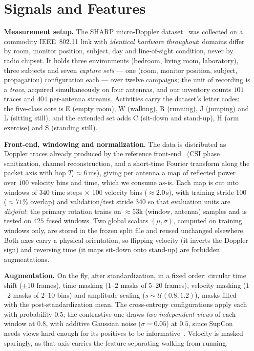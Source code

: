 \section{Signals and Features}
\label{sec:model}

\textbf{Measurement setup.} The SHARP micro-Doppler
dataset~\cite{Meneghello-2023} was collected on a commodity IEEE~802.11 link
with \emph{identical hardware throughout}: domains differ by room, monitor
position, subject, day and line-of-sight condition, never by radio chipset. It
holds three environments (bedroom, living room, laboratory), three subjects
and seven \emph{capture sets} --- one (room, monitor position, subject,
propagation) configuration each --- over twelve campaigns; the unit of
recording is a \emph{trace}, acquired simultaneously on four antennas, and our
inventory counts $101$ traces and $404$ per-antenna streams. Activities carry
the dataset's letter codes: the five-class core is E (empty room), W (walking),
R (running), J (jumping) and L (sitting still), and the extended set adds C
(sit-down and stand-up), H (arm exercise) and S (standing still).

\textbf{Front-end, windowing and normalization.} The data is distributed as
Doppler traces already produced by the reference front-end~\cite{Meneghello-2023} (CSI phase
sanitization, channel reconstruction, and a short-time Fourier transform along
the packet axis with hop $T_c \approx 6$\,ms), giving per antenna a map of
reflected power over $100$ velocity bins and time, which we consume as-is.
Each map is cut into windows of $340$ time steps $\times$ $100$ velocity bins
($\approx2.0$\,s), with training stride $100$ ($\approx71\%$ overlap) and
validation/test stride $340$ so that evaluation units are \emph{disjoint}: the
primary rotation trains on $\approx53$k (window, antenna) samples and is
tested on $425$ fused windows. Two global scalars $(\mu,\sigma)$, computed on
training windows only, are stored in the frozen split file and reused
unchanged elsewhere. Both axes carry a physical orientation, so flipping
velocity (it inverts the Doppler sign) and reversing time (it maps sit-down
onto stand-up) are forbidden augmentations.

\textbf{Augmentation.} On the fly, after standardization, in a fixed order:
circular time shift ($\pm10$ frames), time masking ($1$--$2$ masks of $5$--$20$
frames), velocity masking ($1$--$2$ masks of $2$--$10$ bins) and amplitude
scaling ($s\sim\mathcal{U}(0.8,1.2)$), masks filled with the
post-standardization mean. The cross-entropy configurations apply each with
probability $0.5$; the contrastive one draws \emph{two independent views} of
each window at $0.8$, with additive Gaussian noise ($\sigma=0.05$) at $0.5$,
since SupCon needs views hard enough for its positives to be
informative~\cite{Chen-2020}.
Velocity is masked sparingly,
as that axis carries the feature separating walking from running.

